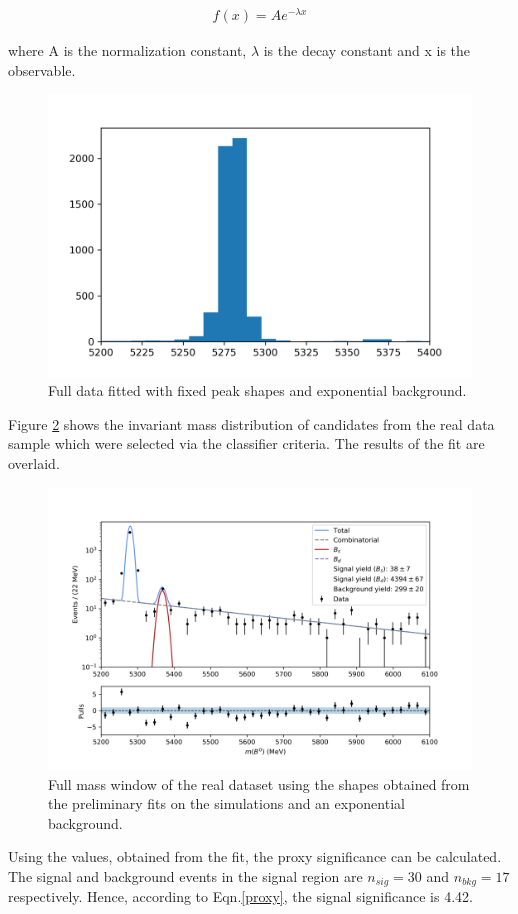     \begin{align}
        f(x)=Ae^{-\lambda x}
    \end{align}

    where A is the normalization constant, $\lambda$ is the decay constant and x is the observable.\\
    
    \begin{figure}[H]
        \centering
        \includegraphics[width=0.8\linewidth]{Figure/second_last.png}
        \caption{Full data fitted with fixed peak shapes and exponential background.}
        \label{sec_last}
    \end{figure}
    Figure \ref{final} shows the invariant mass distribution of candidates from the real data sample which were selected via the classifier criteria. The results of the fit are overlaid.\\
    \begin{figure}[H]
        \centering
        \includegraphics[width=0.8\linewidth]{Figure/final_fit.png}
        \caption{Full mass window of the real dataset using the shapes obtained from the preliminary fits on the simulations and an exponential background.}
        \label{final}
    \end{figure}
    Using the values, obtained from the fit, the proxy significance can be calculated. The signal and background events in the signal region are $n_{sig}=30$ and $n_{bkg}=17$ respectively. Hence, according to Eqn.\ref{proxy}, the signal significance is 4.42.\\
    